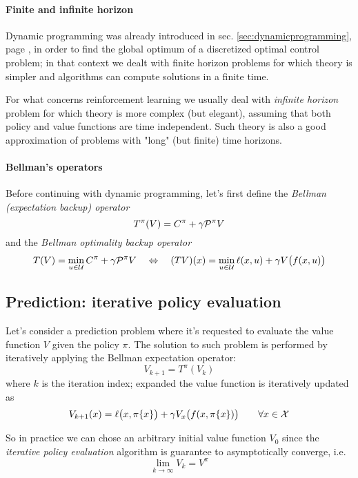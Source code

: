 	\paragraph{Finite and infinite horizon} Dynamic programming was already introduced in sec. \ref{sec:dynamicprogramming}, page \pageref{sec:dynamicprogramming}, in order to find the global optimum of a discretized optimal control problem; in that context we dealt with finite horizon problems for which theory is simpler and algorithms can compute solutions in a finite time.
	
	For what concerns reinforcement learning we usually deal with \textit{infinite horizon} problem for which theory is more complex (but elegant), assuming that both policy and value functions are time independent. Such theory is also a good approximation of problems with "long" (but finite) time horizons.
	
	\paragraph{Bellman's operators} Before continuing with dynamic programming, let's first define the \textit{Bellman (expectation backup) operator}
	\begin{equation} \label{eq:bellmanoperator}
		T^\pi(V) = C^\pi + \gamma \mathcal P^\pi V
	\end{equation}
	and the \textit{Bellman optimality backup operator}
	\begin{equation}
		T(V) = \min_{u\in \mathcal U} C^\pi + \gamma \mathcal P^\pi V \quad \Leftrightarrow \quad  (TV)(x) = \min_{u\in \mathcal U} \ell(x,u) + \gamma V\big(f(x,u)\big)
	\end{equation}
	 
\subsection{Prediction: iterative policy evaluation} \label{sec:policyeval}
	Let's consider a prediction problem where it's requested to evaluate the value function $V$ given the policy $\pi$. The solution to such problem is performed by iteratively applying the Bellman expectation operator:
	\begin{equation}
		V_{k+1} = T^\pi (V_k)
	\end{equation}
	where $k$ is the iteration index; expanded the value function is iteratively updated as
	\[ V_{k+1}(x) = \ell\big(x,\pi\{x\}\big) + \gamma V_x\big(f(x,\pi\{x\})\big) \qquad \forall x \in \mathcal X\]
	
	So in practice we can chose an arbitrary initial value function $V_0$ since the \textit{iterative policy evaluation} algorithm is guarantee to asymptotically converge, i.e.
	\[ \lim_{k\rightarrow \infty} V_k = V^\pi \]
	
